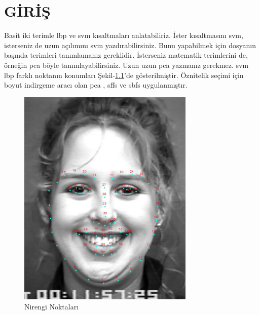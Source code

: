 \chapter{GİRİŞ}



Basit iki terimle \acrfull{lbp} ve \acrfull{svm} kısaltmaları anlatabiliriz. İster kısaltmasını \acrshort{svm}, isterseniz de uzun açılımını \acrlong{svm} yazdırabilirsiniz. Bunu yapabilmek için dosyanın başında terimleri tanımlamanız gereklidir. İsterseniz matematik terimlerini de, örneğin \acrshort{pca} böyle tanımlayabilirsiniz. Uzun uzun \acrfull{pca} yazmanız gerekmez. 
\acrfull{svm}
\acrshort{lbp}
 farklı noktanın konumları Şekil-\ref{fig:68point}'de gösterilmiştir.
\lipsum[3]
Öznitelik seçimi için boyut indirgeme aracı olan \acrfull{pca} , \acrfull{sffs} ve \acrfull{sbfs} uygulanmıştır.  
\begin{figure}[ht]
\centering
\includegraphics[trim={2cm 1.5cm 2cm 8cm},clip,width=0.75\textwidth]{gorseller/68point.jpg}
\caption{Nirengi Noktaları}\label{fig:68point}
\end{figure}

\lipsum[5-8]


